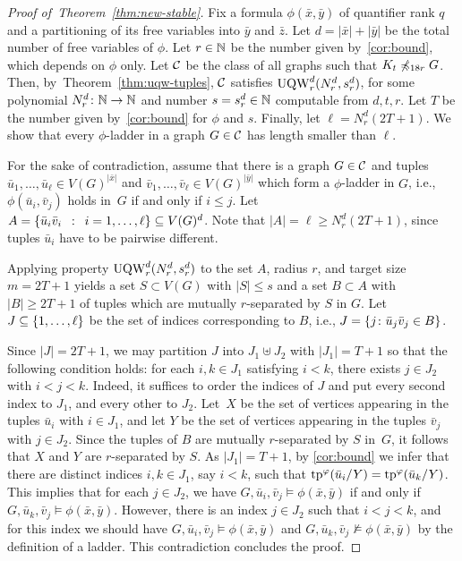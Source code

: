 \begin{proof}[Proof of~Theorem~\ref{thm:new-stable}]
Fix a formula $\phi(\bar x,\bar y)$ of quantifier rank $q$ and
a partitioning of its 
free variables into  $\bar y$ and $\bar z$.
Let $d=|\bar x|+|\bar y|$ be the total number of free variables of $\phi$.
Let $r\in \N$ be the number given by~\autoref{cor:bound},
which depends on $\phi$ only.
Let $\cal C$ be the class of all graphs 
such that  $K_t\not\minor_{18r} G$.
Then, by~Theorem~\ref{thm:uqw-tuples}, 
$\cal C$ satisfies $\uqw^d_{r}(N^d_{r},s^d_r)$,
for some  polynomial  $N^d_r\from\N\to\N$ and number $s=s^d_r\in \N$ computable from $d,t,r$.
Let $T$ be the number given by~\autoref{cor:bound} for $\phi$ and $s$.
 Finally, let 
$\ell=N^d_r(2T+1)$.
We show that 
every $\phi$-ladder in a graph $G\in\cal C$ has length smaller than $\ell$.


For the sake of contradiction, assume that there is a graph $G\in\cal C$
and tuples $\bar u_1,\ldots,\bar u_\ell\in V(G)^{|\bar x|}$ and $ \bar v_1,\ldots, \bar v_\ell\in V(G)^{|\bar y|}$
which form a $\phi$-ladder in $G$, i.e., 
$\phi(\bar u_i,\bar v_j)$ holds in~$G$ if and only if $i\le j$.
	Let $A=\setof{ \bar u_i \bar v_i}{i=1,\ldots,\ell}\subset V(G)^d$. Note that $|A|=\ell\ge N^d_r(2T+1)$, since tuples $\bar u_i$ have to be pairwise different.
  
Applying property  $\uqw^d_r(N^d_r,s^d_r)$ to the set $A$, radius $r$, and target size $m=2T+1$
		 yields a set $S\subset V(G)$ with $|S|\le s$
	and a set $B\subset A$ with $|B|\geq 2T+1$ 
  of tuples which are  mutually $r$-separated by $S$  in $G$.
  Let $J\subseteq \set{1,\ldots,\ell}$
  be the set of indices corresponding to $B$,
  i.e., $J=\set{j\colon\bar u_j\bar v_j\in B}$.
  
  Since $|J|=2T+1$, we may partition $J$ into $J_1\uplus J_2$ with $|J_1|=T+1$ so that the following condition holds:
  for each $i,k\in J_1$ satisfying $i<k$, there exists $j\in J_2$ with $i<j<k$. Indeed, it suffices to order the indices of $J$ and put every second index to $J_1$, and every other to $J_2$.
  Let~$X$ be the set of vertices appearing in the tuples $\bar u_i$ with $i\in J_1$, and let $Y$ be the set of vertices appearing in the tuples $\bar v_j$ with $j\in J_2$.
  Since the tuples of $B$ are mutually $r$-separated by $S$ in~$G$, it follows that $X$ and $Y$ are $r$-separated by $S$.
  As $|J_1|=T+1$, by \autoref{cor:bound} we infer that there are distinct indices $i,k\in J_1$, say $i<k$, such that $\tp^\phi(\bar u_i/Y)=
    \tp^\phi(\bar u_{k}/Y)$. This implies that for each $j\in J_2$, we have $G,\bar u_i,\bar v_j\models \phi(\bar x,\bar y)$ if and only if $G,\bar u_{k},\bar v_j\models \phi(\bar x,\bar y)$.
    However, there is an index $j\in J_2$ such that $i<j<k$, and for this index we should have $G,\bar u_i,\bar v_j\models \phi(\bar x,\bar y)$ and $G,\bar u_{k},\bar v_j\not\models \phi(\bar x,\bar y)$
    by the definition of a ladder. This contradiction concludes the proof.
\end{proof}

